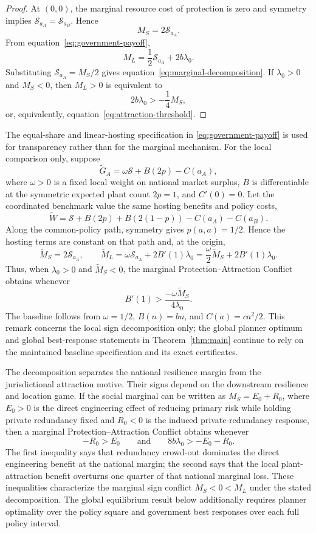 \begin{proof}
At $(0,0)$, the marginal resource cost of protection is zero and symmetry implies $\mathcal S_{a_A}=\mathcal S_{a_B}$. Hence
\[
M_S=2\mathcal S_{a_A}.
\]
From equation~\eqref{eq:government-payoff},
\[
M_L=\frac12\mathcal S_{a_A}+2b\lambda_0.
\]
Substituting $\mathcal S_{a_A}=M_S/2$ gives equation~\eqref{eq:marginal-decomposition}. If $\lambda_0>0$ and $M_S<0$, then $M_L>0$ is equivalent to
\[
2b\lambda_0>-\frac14 M_S,
\]
or, equivalently, equation~\eqref{eq:attraction-threshold}.
\end{proof}

\begin{remark}\label{rem:general-incidence}
The equal-share and linear-hosting specification in \eqref{eq:government-payoff} is used for transparency rather than for the marginal mechanism. For the local comparison only, suppose
\[
\widetilde G_A=\omega\mathcal S+B(2p)-C(a_A),
\]
where $\omega>0$ is a fixed local weight on national market surplus, $B$ is differentiable at the symmetric expected plant count $2p=1$, and $C'(0)=0$. Let the coordinated benchmark value the same hosting benefits and policy costs,
\[
\widetilde W
=
\mathcal S+B(2p)+B\!\left(2(1-p)\right)-C(a_A)-C(a_B).
\]
Along the common-policy path, symmetry gives $p(a,a)=1/2$. Hence the hosting terms are constant on that path and, at the origin,
\[
\widetilde M_S=2\mathcal S_{a_A},
\qquad
\widetilde M_L
=
\omega\mathcal S_{a_A}+2B'(1)\lambda_0
=
\frac{\omega}{2}\widetilde M_S+2B'(1)\lambda_0.
\]
Thus, when $\lambda_0>0$ and $\widetilde M_S<0$, the marginal Protection--Attraction Conflict obtains whenever
\[
B'(1)>\frac{-\omega\widetilde M_S}{4\lambda_0}.
\]
The baseline follows from $\omega=1/2$, $B(n)=bn$, and $C(a)=ca^2/2$. This remark concerns the local sign decomposition only; the global planner optimum and global best-response statements in Theorem~\ref{thm:main} continue to rely on the maintained baseline specification and its exact certificates.
\end{remark}

The decomposition separates the national resilience margin from the jurisdictional attraction motive. Their signs depend on the downstream resilience and location game. If the social marginal can be written as $M_S=E_0+R_0$, where $E_0>0$ is the direct engineering effect of reducing primary risk while holding private redundancy fixed and $R_0<0$ is the induced private-redundancy response, then a marginal Protection--Attraction Conflict obtains whenever
\begin{equation}
-R_0>E_0
\qquad\text{and}\qquad
8b\lambda_0>-E_0-R_0.
\label{eq:transparent-conflict}
\end{equation}
The first inequality says that redundancy crowd-out dominates the direct engineering benefit at the national margin; the second says that the local plant-attraction benefit overturns one quarter of that national marginal loss. These inequalities characterize the marginal sign conflict $M_S<0<M_L$ under the stated decomposition. The global equilibrium result below additionally requires planner optimality over the policy square and government best responses over each full policy interval.

